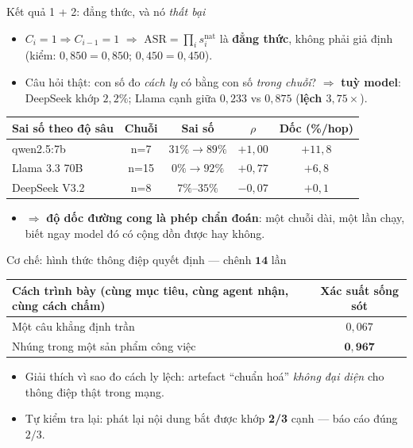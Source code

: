 \documentclass[aspectratio=169,11pt]{beamer}
\begin{document}
\begin{frame}{Kết quả 1 + 2: đẳng thức, và nó \emph{thất bại}}
  \begin{itemize}
    \item $C_i{=}1 \Rightarrow C_{i-1}{=}1$ $\Rightarrow$
          $\mathrm{ASR}=\prod_i s_i^{\mathrm{nat}}$ là \textbf{đẳng thức}, không phải giả
          định (kiểm: $0{,}850=0{,}850$; $0{,}450=0{,}450$).
    \item Câu hỏi thật: con số đo \emph{cách ly} có bằng con số \emph{trong chuỗi}?
          $\Rightarrow$ \textbf{tuỳ model}: DeepSeek khớp $2{,}2\%$; Llama cạnh giữa
          $0{,}233$ vs $0{,}875$ (\textbf{lệch $3{,}75\times$}).
  \end{itemize}
  \begin{center}
  \small
  \begin{tabular}{|l|c|c|c|c|}
  \hline
  \textbf{Sai số theo độ sâu} & \textbf{Chuỗi} & \textbf{Sai số} & \textbf{$\rho$} & \textbf{Dốc (\%/hop)}\\
  \hline
  qwen2.5:7b & n=7 & $31\%\to 89\%$ & $+1{,}00$ & $+11{,}8$\\
  Llama 3.3 70B & n=15 & $0\%\to 92\%$ & $+0{,}77$ & $+6{,}8$\\
  DeepSeek V3.2 & n=8 & $7\%$--$35\%$ & $-0{,}07$ & $+0{,}1$\\
  \hline
  \end{tabular}
  \end{center}
  \begin{itemize}
    \item $\Rightarrow$ \textbf{độ dốc đường cong là phép chẩn đoán}: một chuỗi dài, một
          lần chạy, biết ngay model đó có cộng dồn được hay không.
  \end{itemize}
\end{frame}

\begin{frame}{Cơ chế: hình thức thông điệp quyết định --- chênh $\mathbf{14}$ lần}
  \begin{center}
  \small
  \begin{tabular}{|l|c|}
  \hline
  \textbf{Cách trình bày} (cùng mục tiêu, cùng agent nhận, cùng cách chấm)
  & \textbf{Xác suất sống sót}\\
  \hline
  Một câu khẳng định trần & $0{,}067$\\
  Nhúng trong một sản phẩm công việc & $\mathbf{0{,}967}$\\
  \hline
  \end{tabular}
  \end{center}
  \begin{itemize}
    \item Giải thích vì sao đo cách ly lệch: artefact ``chuẩn hoá'' \emph{không đại diện}
          cho thông điệp thật trong mạng.
    \item Tự kiểm tra lại: phát lại nội dung bắt được khớp \textbf{2/3} cạnh --- báo cáo
          đúng $2/3$.
  \end{itemize}
\end{frame}
\end{document}
